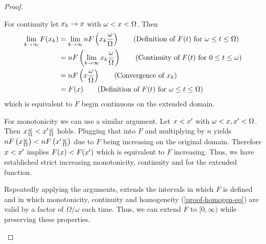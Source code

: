 \begin{proof}
\begin{proofpart}
		For continuity let $x_k \rightarrow x$ with $\omega < x < \Omega$. Then
		\begin{align*}
			\lim_{k \rightarrow \infty} F(\ta_k) & = \lim_{k \rightarrow \infty} n F \left ( \ta_k \frac{\omega}{\Omega} \right) \tag{Definition of $F(t)$ for $\omega \leq t \leq \Omega$} \\
			                                     & = n F \left ( \lim_{k \rightarrow \infty} \ta_k \frac{\omega}{\Omega} \right) \tag{Continuity of $F(t)$ for $0 \leq t \leq \omega$}      \\
			                                     & = n F \left ( \ta \frac{\omega}{\Omega} \right) \tag{Convergence of $\ta_k$}                                                             \\
			                                     & = F(\ta) \tag{Definition of $F(t)$ for $\omega \leq t \leq \Omega$}
		\end{align*}
		which is equivalent to $F$ begin continuous on the extended domain.

		For monotonicity we can use a similar argument. Let $x < x'$ with $\omega < x, x' < \Omega$. Then $x \frac{\omega}{\Omega} < x' \frac{\omega}{\Omega}$ holds. Plugging that into $F$ and multiplying by $n$ yields $nF \left(x \frac{\omega}{\Omega}\right) <nF \left( x' \frac{\omega}{\Omega}\right)$ due to $F$ being increasing on the original domain. Therefore $x < x'$ implies $F(x) < F(x')$ which is equivalent to $F$ increasing.
		Thus, we have established strict increasing monotonicity, continuity and  for the extended function.

		Repeatedly applying the arguments, extends the intervals in which $F$ is defined and in which monotonicity, continuity and homogeneity (\cref{proof-homogen-eq}) are valid by a factor of $\Omega/\omega$ each time. Thus, we can extend $F$ to $[0, \infty)$ while preserving these properties.


\end{proofpart}
\end{proof}
